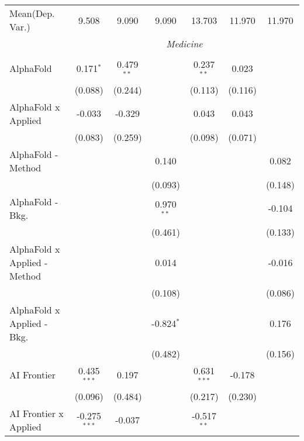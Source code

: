 \begin{tabular}{lcccccc}
Mean(Dep. Var.) & 9.508 & 9.090 & 9.090 & 13.703 & 11.970 & 11.970 \\
 & \multicolumn{6}{c}{\textit{Medicine}} \\ \\
   AlphaFold                      & 0.171$^{*}$    & 0.479$^{**}$  &                & 0.237$^{**}$  & 0.023   &   \\   
                                  & (0.088)        & (0.244)       &                & (0.113)       & (0.116) &   \\   
   AlphaFold x Applied            & -0.033         & -0.329        &                & 0.043         & 0.043   &   \\   
                                  & (0.083)        & (0.259)       &                & (0.098)       & (0.071) &   \\   
   AlphaFold - Method             &                &               & 0.140          &               &         & 0.082\\   
                                  &                &               & (0.093)        &               &         & (0.148)\\   
   AlphaFold - Bkg.               &                &               & 0.970$^{**}$   &               &         & -0.104\\   
                                  &                &               & (0.461)        &               &         & (0.133)\\   
   AlphaFold x Applied - Method   &                &               & 0.014          &               &         & -0.016\\   
                                  &                &               & (0.108)        &               &         & (0.086)\\   
   AlphaFold x Applied - Bkg.     &                &               & -0.824$^{*}$   &               &         & 0.176\\   
                                  &                &               & (0.482)        &               &         & (0.156)\\   
   AI Frontier                    & 0.435$^{***}$  & 0.197         &                & 0.631$^{***}$ & -0.178  &   \\   
                                  & (0.096)        & (0.484)       &                & (0.217)       & (0.230) &   \\   
   AI Frontier x Applied          & -0.275$^{***}$ & -0.037        &                & -0.517$^{**}$ &         &   \\   

\end{tabular}
